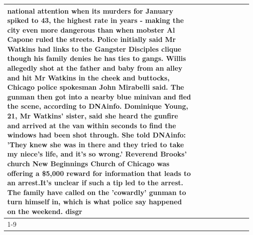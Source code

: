 \begin{table}[H]
\begin{tabular}{lllrlllll}
national attention when its murders for January spiked to 43, the highest rate in years - making the city even more dangerous than when mobster Al Capone ruled the streets. Police initially said Mr Watkins had links to the Gangster Disciples clique though his family denies he has ties to gangs. Willis allegedly shot at the father and baby from an alley and hit Mr Watkins in the cheek and buttocks, Chicago police spokesman John Mirabelli said. The gunman then got into a nearby blue minivan and fled the scene, according to DNAinfo. Dominique Young, 21, Mr Watkins' sister, said she heard the gunfire and arrived at the van within seconds to find the windows had been shot through. She told DNAinfo: 'They knew she was in there and they tried to take my niece's life, and it's so wrong.' Reverend Brooks' church New Beginnings Church of Chicago was offering a \$5,000 reward for information that leads to an arrest.It's unclear if such a tip led to the arrest. The family have called on the 'cowardly' gunman to turn himself in, which is what police say happened on the weekend. disgr \\
\cline{1-9}

\end{tabular}
\end{table}
